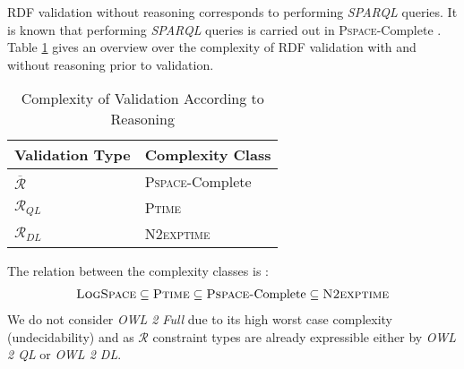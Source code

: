 \documentclass{acm_proc_article-sp}
\begin{document}
RDF validation without reasoning corresponds to performing \emph{SPARQL} queries.  
It is known that performing \emph{SPARQL} queries is carried out in \textsc{Pspace}-Complete \cite{Perez2009}. 
Table \ref{tab:constraint-type-specific-complexity-classes} gives an overview over the complexity of RDF validation with and without reasoning prior to validation.
\begin{table}[H]
\centering
\caption{Complexity of Validation According to Reasoning}
\scriptsize
\begin{tabular}{>{\centering\arraybackslash}m{1.5in} | >{\centering\arraybackslash}m{1in}} 
\textbf{Validation Type}  & \textbf{Complexity Class}\\
\hline
$\overline{\mathcal{R}}$ & \textsc{Pspace}-Complete \\[7pt] 
\hline
$\mathcal{R}_{QL}$ & \textsc{Ptime} \\[7pt]
\hline
$\mathcal{R}_{DL}$ & \textsc{N2exptime} \\[7pt]
\end{tabular}
\label{tab:constraint-type-specific-complexity-classes}
\end{table}
The relation between the complexity classes is \cite{Arora:2009:CCM:1540612}:
\begin{eqnarray*}
\textsc{LogSpace} \subseteq \textsc{Ptime} \subseteq \textsc{Pspace-}\text{Complete} \subseteq \textsc{N2exptime} 
\end{eqnarray*}
We do not consider \emph{OWL 2 Full} 
due to its high worst case complexity (undecidability) and
as $\mathcal{R}$ constraint types are already expressible either by \emph{OWL 2 QL} or \emph{OWL 2 DL}.

\end{document}
